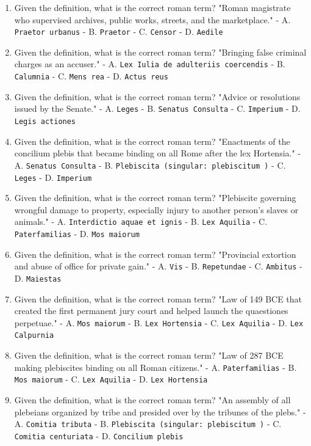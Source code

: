\documentclass[11pt]{article}
\begin{document}
\begin{enumerate}
\item Given the definition, what is the correct roman term? "Roman magistrate who supervised archives, public works, streets, and the marketplace." - A. \texttt{Praetor urbanus} - B. \texttt{Praetor} - C. \texttt{Censor} - D. \texttt{Aedile}
\item Given the definition, what is the correct roman term? "Bringing false criminal charges as an accuser." - A. \texttt{Lex Iulia de adulteriis coercendis} - B. \texttt{Calumnia} - C. \texttt{Mens rea} - D. \texttt{Actus reus}
\item Given the definition, what is the correct roman term? "Advice or resolutions issued by the Senate." - A. \texttt{Leges} - B. \texttt{Senatus Consulta} - C. \texttt{Imperium} - D. \texttt{Legis actiones}
\item Given the definition, what is the correct roman term? "Enactments of the concilium plebis that became binding on all Rome after the lex Hortensia." - A. \texttt{Senatus Consulta} - B. \texttt{Plebiscita (singular: plebiscitum )} - C. \texttt{Leges} - D. \texttt{Imperium}
\item Given the definition, what is the correct roman term? "Plebiscite governing wrongful damage to property, especially injury to another person's slaves or animals." - A. \texttt{Interdictio aquae et ignis} - B. \texttt{Lex Aquilia} - C. \texttt{Paterfamilias} - D. \texttt{Mos maiorum}
\item Given the definition, what is the correct roman term? "Provincial extortion and abuse of office for private gain." - A. \texttt{Vis} - B. \texttt{Repetundae} - C. \texttt{Ambitus} - D. \texttt{Maiestas}
\item Given the definition, what is the correct roman term? "Law of 149 BCE that created the first permanent jury court and helped launch the quaestiones perpetuae." - A. \texttt{Mos maiorum} - B. \texttt{Lex Hortensia} - C. \texttt{Lex Aquilia} - D. \texttt{Lex Calpurnia}
\item Given the definition, what is the correct roman term? "Law of 287 BCE making plebiscites binding on all Roman citizens." - A. \texttt{Paterfamilias} - B. \texttt{Mos maiorum} - C. \texttt{Lex Aquilia} - D. \texttt{Lex Hortensia}
\item Given the definition, what is the correct roman term? "An assembly of all plebeians organized by tribe and presided over by the tribunes of the plebs." - A. \texttt{Comitia tributa} - B. \texttt{Plebiscita (singular: plebiscitum )} - C. \texttt{Comitia centuriata} - D. \texttt{Concilium plebis}

\end{enumerate}
\end{document}
